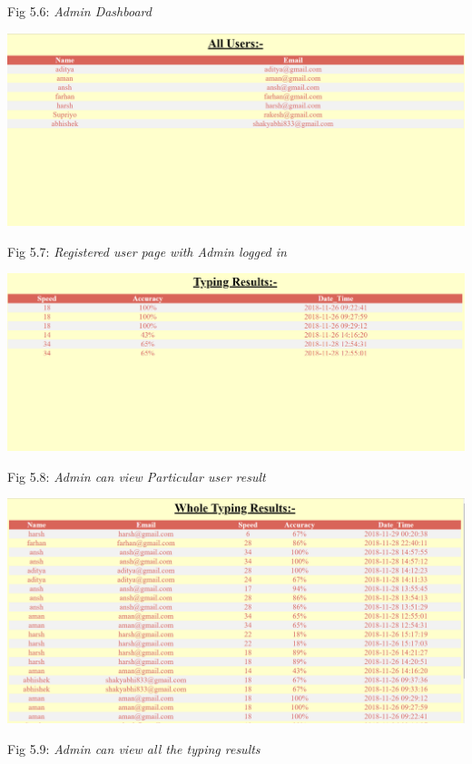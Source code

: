 \documentclass{mnnit}
\begin{document}
\begin{center}
Fig 5.6: \emph{Admin Dashboard}
\end{center}
\includegraphics[width=\textwidth]{images/7_admin_view_allusers.PNG}
\begin{center}
Fig 5.7: \emph{Registered user page with Admin logged in}\\
\end{center}
\includegraphics[width=\textwidth]{images/8_img.PNG}
\begin{center}
Fig 5.8: \emph{Admin can view Particular user result}\\
\end{center}
\includegraphics[width=\textwidth]{images/9_img.PNG}
\begin{center}
Fig 5.9: \emph{Admin can view all the typing results}\\
\end{center}
\end{document}
